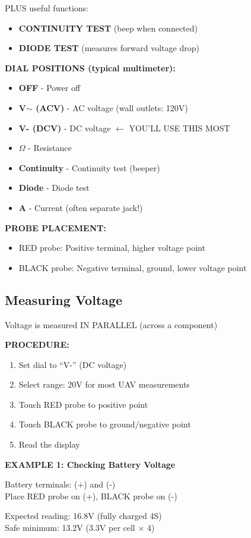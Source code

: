\documentclass[11pt,letterpaper]{article}
\begin{document}
PLUS useful functions:
\begin{itemize}
\item \textbf{CONTINUITY TEST} (beep when connected)
\item \textbf{DIODE TEST} (measures forward voltage drop)
\end{itemize}

\textbf{DIAL POSITIONS (typical multimeter):}
\begin{itemize}
\item \textbf{OFF} - Power off
\item \textbf{V$\sim$ (ACV)} - AC voltage (wall outlets: 120V)
\item \textbf{V- (DCV)} - DC voltage $\leftarrow$ YOU'LL USE THIS MOST
\item \textbf{$\Omega$} - Resistance
\item \textbf{Continuity} - Continuity test (beeper)
\item \textbf{Diode} - Diode test
\item \textbf{A} - Current (often separate jack!)
\end{itemize}

\textbf{PROBE PLACEMENT:}
\begin{itemize}
\item RED probe: Positive terminal, higher voltage point
\item BLACK probe: Negative terminal, ground, lower voltage point
\end{itemize}

\subsection{Measuring Voltage}

Voltage is measured IN PARALLEL (across a component)

\textbf{PROCEDURE:}
\begin{enumerate}
\item Set dial to ``V-'' (DC voltage)
\item Select range: 20V for most UAV measurements
\item Touch RED probe to positive point
\item Touch BLACK probe to ground/negative point
\item Read the display
\end{enumerate}

\begin{examplebox}
\textbf{EXAMPLE 1: Checking Battery Voltage}

Battery terminals: (+) and (-)\\
Place RED probe on (+), BLACK probe on (-)

Expected reading: 16.8V (fully charged 4S)\\
Safe minimum: 13.2V (3.3V per cell $\times$ 4)
\end{examplebox}
\end{document}
